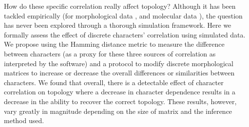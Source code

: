 \documentclass[12pt,letterpaper]{article}
\begin{document}
How do these specific correlation really affect topology?
Although it has been tackled empirically (for morphological data \citealt{Davalos01072014}, and molecular data \citealt{ZouConvergence}), the question has never been explored through a thorough simulation framework. %
Here we formally assess the effect of discrete characters' correlation using simulated data.
We propose %
using the Hamming distance metric to measure the difference between characters (as a proxy for these three sources of correlation as interpreted by the software) and a protocol to modify discrete morphological matrices to increase or decrease the overall differences or similarities between characters.
We found that overall, there is a detectable effect of character correlation on topology where a decrease in character dependence results in a decrease in the ability to recover the correct topology.
These results, however, vary greatly in magnitude depending on the size of matrix and the inference method used.
\end{document}

